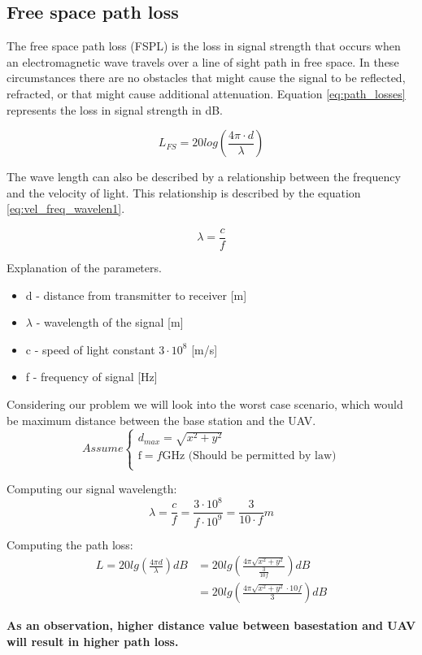 
\subsection*{Free space path loss}\label{subsection:path_loss}

The free space path loss (FSPL) is the loss in signal strength that occurs when an electromagnetic wave travels over a line of sight path in free space. In these circumstances there are no obstacles that might cause the signal to be reflected, refracted, or that might cause additional attenuation. Equation \ref{eq:path_losses} represents the loss in signal strength in dB.

\begin{equation}\label{eq:path_losses}
L_{FS} = 20log\left (\frac{4\pi \cdot d}{\lambda} \right)
\end{equation}

The wave length can also be described by a relationship between the frequency and the velocity of light. This relationship is described by the equation \ref{eq:vel_freq_wavelen1}.

\begin{equation}\label{eq:vel_freq_wavelen1}
\lambda = \frac{c}{f}
\end{equation}


Explanation of the parameters.
\begin{itemize}
\item d - distance from transmitter to receiver [m]
\item $\lambda$ - wavelength of the signal [m]
\item c - speed of light constant $3\cdot 10^8$ [m/s] 
\item f - frequency of signal [Hz]
\end{itemize}

Considering our problem we will look into the worst case scenario, which would be maximum distance between the base station and the UAV. 
\begin{equation*}
Assume \begin{cases}
d_{max} = \sqrt{x^2+y^2}\\
\text{f} = f\text{GHz (Should be permitted by law})\\
\end{cases}
\end{equation*}

Computing our signal wavelength:
\begin{equation}\label{eq:vel_freq_wavelen2}
	\lambda = \frac{c}{f} 
	        = \frac{3\cdot 10^{8}}{f\cdot 10^{9}}
	        = \frac{3}{10\cdot f}m
\end{equation}

Computing the path loss:
\begin{align*}\label{eq:path_loses_calc}
	L = 20lg\left (\frac{4\pi d}{\lambda} \right) dB &= 20lg\left (\frac{4\pi \sqrt{x^2+y^2}}{\frac{3}{10f}} \right) dB \\ 
	&= 20lg\left (\frac{4\pi \sqrt{x^2+y^2}\cdot 10f}{ 3} \right) dB
\end{align*}

\noindent \textbf{As an observation, higher distance value between basestation and UAV will result in higher path loss.}
